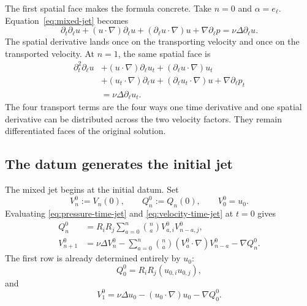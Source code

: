 The first spatial face makes the formula concrete.  Take \(n=0\) and
\(\alpha=e_\ell\).  Equation~\eqref{eq:mixed-jet} becomes
\begin{equation*}
 \partial_t\partial_\ell u
 +(u\cdot\nabla)\partial_\ell u
 +(\partial_\ell u\cdot\nabla)u
 +\nabla\partial_\ell p
 =\nu\Delta\partial_\ell u.
\end{equation*}
The spatial derivative lands once on the transporting velocity and once on
the transported velocity.  At \(n=1\), the same spatial face is
\begin{align*}
 \partial_t^2\partial_\ell u
 &+(u\cdot\nabla)\partial_\ell u_t
  +(\partial_\ell u\cdot\nabla)u_t
 \\
 &+(u_t\cdot\nabla)\partial_\ell u
  +(\partial_\ell u_t\cdot\nabla)u
  +\nabla\partial_\ell p_t
 \\
 &=\nu\Delta\partial_\ell u_t.
\end{align*}
The four transport terms are the four ways one time derivative and one spatial
derivative can be distributed across the two velocity factors.  They remain
differentiated faces of the original solution.

\subsection{The datum generates the initial jet}

The mixed jet begins at the initial datum.  Set
\begin{equation*}
 V_n^0:=V_n(0),
 \qquad
 Q_n^0:=Q_n(0),
 \qquad
 V_0^0=u_0.
\end{equation*}
Evaluating \eqref{eq:pressure-time-jet} and
\eqref{eq:velocity-time-jet} at \(t=0\) gives
\begin{align}
 Q_n^0
 &=R_iR_j\sum_{a=0}^n\binom na
   V_{a,i}^0V_{n-a,j}^0,
 \label{eq:initial-pressure}
 \\
 V_{n+1}^0
 &=\nu\Delta V_n^0
 -\sum_{a=0}^n\binom na
  (V_a^0\cdot\nabla)V_{n-a}^0
 -\nabla Q_n^0.
 \label{eq:initial-velocity}
\end{align}
The first row is already determined entirely by \(u_0\):
\begin{equation*}
 Q_0^0=R_iR_j(u_{0,i}u_{0,j}),
\end{equation*}
and
\begin{equation*}
 V_1^0
 =\nu\Delta u_0
 -(u_0\cdot\nabla)u_0
 -\nabla Q_0^0.
\end{equation*}


